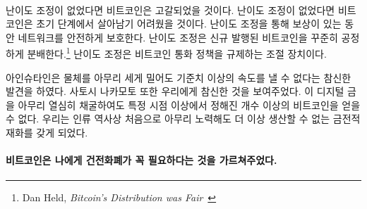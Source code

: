 \paragraph{}
\begin{comment}	
If it weren't for this difficulty adjustment, all bitcoins would have been mined
already. If it weren't for this difficulty adjustment, Bitcoin probably wouldn't
have survived in its infancy. It is what secures the network in its reward era.
It is what ensures a steady and fair distribution\footnote{Dan Held,
\textit{Bitcoin's Distribution was Fair}~\cite{distribution-was-fair}} of new
bitcoin. It is the thermostat which regulates Bitcoin's monetary policy.
\end{comment}
난이도 조정이 없었다면 비트코인은 고갈되었을 것이다. 
난이도 조정이 없었다면 비트코인은 초기 단계에서 살아남기 어려웠을 것이다.
난이도 조정을 통해 보상이 있는 동안 네트워크를 안전하게 보호한다. 
난이도 조정은 신규 발행된 비트코인을 꾸준히 공정하게 분배한다.\footnote{Dan Held,
	\textit{Bitcoin’s Distribution was Fair}~\cite{distribution-was-fair}}
난이도 조정은 비트코인 통화 정책을 규제하는 조절 장치이다.

\begin{comment}	
Einstein showed us something novel: no matter how hard you push an
object, at a certain point you won't be able to get more speed out of
it. Satoshi also showed us something novel: no matter how hard you dig
for this digital gold, at a certain point you won't be able to get more
bitcoin out of it. For the first time in human history, we have a
monetary good which, no matter how hard you try, you won't be able to
produce more of.
\end{comment}
아인슈타인은 물체를 아무리 세게 밀어도 기준치 이상의 속도를 낼 수 없다는 참신한 발견을 하였다.
사토시 나카모토 또한 우리에게 참신한 것을 보여주었다. 
이 디지털 금을 아무리 열심히 채굴하여도 특정 시점 이상에서 정해진 개수 이상의 비트코인을 얻을 수 없다. 
우리는 인류 역사상 처음으로 아무리 노력해도 더 이상 생산할 수 없는 금전적 재화를 갖게 되었다.

\paragraph{비트코인은 나에게 건전화폐가 꼭 필요하다는 것을 가르쳐주었다.}

